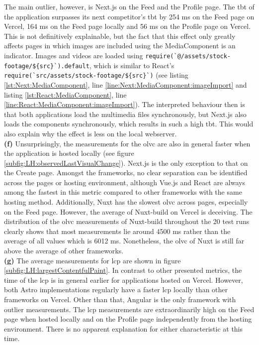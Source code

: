 \documentclass[a4paper, 12pt]{article}
\begin{document}
The main outlier, however, is Next.js on the Feed and the Profile page.
The \acrshort{tbt} of the application surpasses its next competitor's \acrshort{tbt} by 254 ms on the Feed page on Vercel, 164 ms on the Feed page locally and 56 ms on the Profile page on Vercel.
This is not definitively explainable, but the fact that this effect only greatly affects pages in which images are included using the MediaComponent is an indicator.
Images and videos are loaded using \lstinline|require(`@/assets/stock-footage/${src}`).default|, which is similar to React's \lstinline|require(`src/assets/stock-footage/${src}`)| (see listing \ref{lst:Next:MediaComponent}, line \ref{line:Next:MediaComponent:imageImport} and listing \ref{lst:React:MediaComponent}, line \ref{line:React:MediaComponent:imageImport}).
The interpreted behaviour then is that both applications load the multimedia files synchronously, but Next.js also loads the components synchronously, which results in such a high \acrlong{tbt}.
This would also explain why the effect is less on the local webserver.
\\

\textbf{(f)} Unsurprisingly, the measurements for the \acrfull{olvc} are also in general faster when the application is hosted locally (see figure \ref{subfig:LH:observedLastVisualChange}).
Next.js is the only exception to that on the Create page.
Amongst the frameworks, no clear separation can be identified across the pages or hosting environment, although Vue.js and React are always among the fastest in this metric compared to other frameworks with the same hosting method.
Additionally, Nuxt has the slowest \acrshort{olvc} across pages, especially on the Feed page.
However, the average of Nuxt-build on Vercel is deceiving.
The distribution of the \acrshort{olvc} measurements of Nuxt-build throughout the 20 test runs clearly shows that most measurements lie around 4500 ms rather than the average of all values which is 6012 ms.
Nonetheless, the \acrshort{olvc} of Nuxt is still far above the average of other frameworks.
\\

\textbf{(g)} The average measurements for \acrfull{lcp} are shown in figure \ref{subfig:LH:largestContentfulPaint}.
In contrast to other presented metrics, the time of the \acrshort{lcp} is in general earlier for applications hosted on Vercel.
However, both Astro implementations regularly have a faster \acrshort{lcp} locally than other frameworks on Vercel.
Other than that, Angular is the only framework with outlier measurements.
The \acrshort{lcp} measurements are extraordinarily high on the Feed page when hosted locally and on the Profile page independently from the hosting environment.
There is no apparent explanation for either characteristic at this time.
\end{document}
